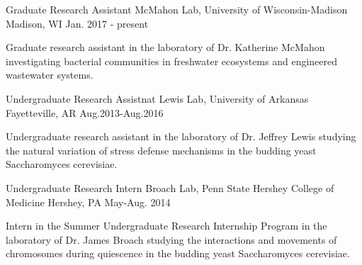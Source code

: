 \begin{cventries}
  \cventry
    {Graduate Research Assistant} %
    {McMahon Lab, University of Wisconsin-Madison} %
    {Madison, WI} %
    {Jan. 2017 - present} %
    {
      \begin{cvitems} %
        \item {Graduate research assistant in the laboratory of Dr. Katherine McMahon investigating bacterial communities in freshwater ecosystems and engineered wastewater systems.}
      \end{cvitems}
    }

  \cventry
    {Undergraduate Research Assistnat} %
    {Lewis Lab, University of Arkansas} %
    {Fayetteville, AR} %
    {Aug.2013-Aug.2016} %
    {
      \begin{cvitems} %
        \item {Undergraduate research assistant in the laboratory of Dr. Jeffrey Lewis studying the natural variation of stress defense mechanisms in the budding yeast Saccharomyces cerevisiae.}
      \end{cvitems}
    }

  \cventry
    {Undergraduate Research Intern} %
    {Broach Lab, Penn State Hershey College of Medicine} %
    {Hershey, PA} %
    {May-Aug. 2014} %
    {
      \begin{cvitems} %
        \item {Intern in the Summer Undergraduate Research Internship Program in the laboratory of Dr. James Broach studying the interactions and movements of chromosomes during quiescence in the budding yeast Saccharomyces cerevisiae.}
      \end{cvitems}
    }
\end{cventries}

